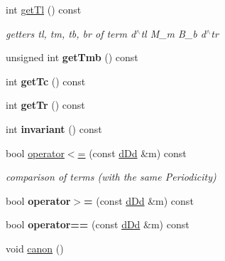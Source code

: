 \begin{DoxyCompactItemize}
int \mbox{\hyperlink{classetvo_i_i_1_1d_dd_a88e9d033203d8bc1e6c4526a6cf6e886}{get\+Tl}} () const
\begin{DoxyCompactList}\small\item\em getters tl, tm, tb, br of term d$^\wedge$tl M\+\_\+m B\+\_\+b d$^\wedge$tr \end{DoxyCompactList}\item 
\mbox{\label{classetvo_i_i_1_1d_dd_a170858bf26fc452cc7a46d012ca6fb82}} 
unsigned int {\bfseries get\+Tmb} () const
\item 
\mbox{\label{classetvo_i_i_1_1d_dd_aaf87c5cc6ebd68fb0b8dc64f4aaff579}} 
int {\bfseries get\+Tc} () const
\item 
\mbox{\label{classetvo_i_i_1_1d_dd_a8753ccd2a8e2467ce149cc2bebc71493}} 
int {\bfseries get\+Tr} () const
\item 
\mbox{\label{classetvo_i_i_1_1d_dd_a7e5fbf1e7667775772d51d947b3d4bf7}} 
int {\bfseries invariant} () const
\item 
\mbox{\label{classetvo_i_i_1_1d_dd_a627727ac316aa74b1f8e1245e6a2d149}} 
bool \mbox{\hyperlink{classetvo_i_i_1_1d_dd_a627727ac316aa74b1f8e1245e6a2d149}{operator$<$=}} (const \mbox{\hyperlink{classetvo_i_i_1_1d_dd}{d\+Dd}} \&m) const
\begin{DoxyCompactList}\small\item\em comparison of terms (with the same Periodicity) \end{DoxyCompactList}\item 
\mbox{\label{classetvo_i_i_1_1d_dd_a2f1d35a49de7c483ba25627ff8e82b54}} 
bool {\bfseries operator$>$=} (const \mbox{\hyperlink{classetvo_i_i_1_1d_dd}{d\+Dd}} \&m) const
\item 
\mbox{\label{classetvo_i_i_1_1d_dd_acc021b39175f5d7cf2217310556852ce}} 
bool {\bfseries operator==} (const \mbox{\hyperlink{classetvo_i_i_1_1d_dd}{d\+Dd}} \&m) const
\item 
\mbox{\label{classetvo_i_i_1_1d_dd_a92841b7a464cfce38be5f7b0990f89d8}} 
void \mbox{\hyperlink{classetvo_i_i_1_1d_dd_a92841b7a464cfce38be5f7b0990f89d8}{canon}} ()

\end{DoxyCompactItemize}

